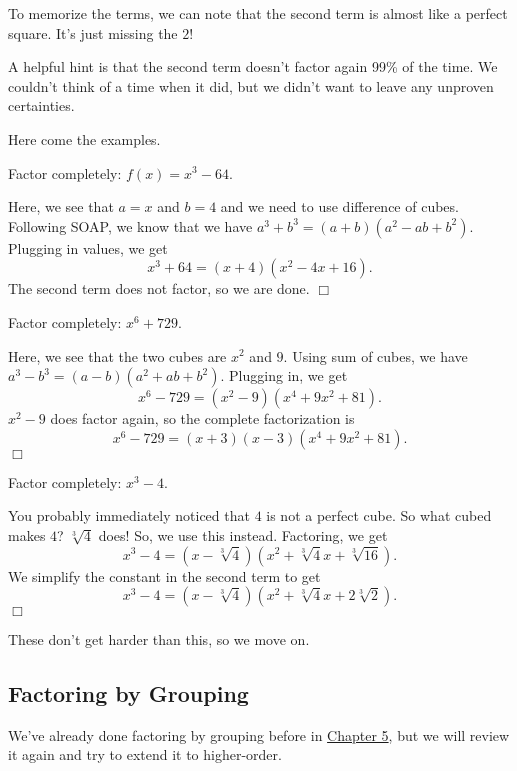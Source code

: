 \documentclass[../book.tex]{subfiles}
\begin{document}
To memorize the terms, we can note that the second term is almost like a perfect square.  It's just missing the $2$!

A helpful hint is that the second term doesn't factor again 99\% of the time.  We couldn't think of a time when it did, but we didn't want to leave any unproven certainties.

Here come the examples.
\begin{example}
Factor completely: $f(x)=x^3-64$.
\end{example}
\begin{solution}
Here, we see that $a=x$ and $b=4$ and we need to use difference of cubes.  Following SOAP, we know that we have $a^3+b^3=(a+b)(a^2-ab+b^2)$. Plugging in values, we get $$x^3+64=(x+4)(x^2-4x+16).$$ The second term does not factor, so we are done. $\Box$
\end{solution}
\begin{example}
Factor completely: $x^6+729$.
\end{example}
\begin{solution}
Here, we see that the two cubes are $x^2$ and $9$.  Using sum of cubes, we have $a^3-b^3=(a-b)(a^2+ab+b^2)$. Plugging in, we get $$x^6-729=(x^2-9)(x^4+9x^2+81).$$ $x^2-9$ does factor again, so the complete factorization is $$x^6-729=(x+3)(x-3)(x^4+9x^2+81).$$ $\Box$
\end{solution}
\begin{example}
Factor completely: $x^3-4$.
\end{example}
\begin{solution}
You probably immediately noticed that $4$ is not a perfect cube.  So what cubed makes $4$? $\sqrt[3]{4}$ does!  So, we use this instead. Factoring, we get $$x^3-4=(x-\sqrt[3]{4})(x^2+\sqrt[3]{4}x+\sqrt[3]{16}).$$ We simplify the constant in the second term to get $$x^3-4=(x-\sqrt[3]{4})(x^2+\sqrt[3]{4}x+2\sqrt[3]{2}).$$ $\Box$
\end{solution}
These don't get harder than this, so we move on.
\subsection{Factoring by Grouping}
\noindent We've already done factoring by grouping before in \hyperlink{chapter.5}{Chapter 5}, but we will review it again and try to extend it to higher-order.
\end{document}
